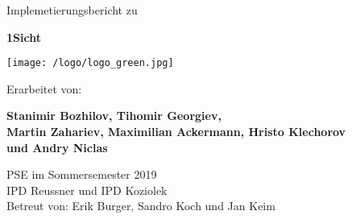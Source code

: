 \begin{titlepage}

    \begin{center}

        \vspace*{1cm}

            \LARGE
            Implemetierungsbericht zu

            \Huge
            \textbf{1Sicht}

            \vspace{2cm}

            \texttt{[image: /logo/logo\_green.jpg]}

            \vspace{2cm}
            Erarbeitet von:

            \Large
            \textbf{Stanimir Bozhilov, Tihomir Georgiev,\\ Martin Zahariev, Maximilian Ackermann, Hristo Klechorov\\ und Andry Niclas}

            \vspace{0.3cm}
            \Large
            PSE im Sommersemester 2019\\
            \vspace{0.3cm}
            IPD Reussner und IPD Koziolek\\
            Betreut von: Erik Burger, Sandro Koch und Jan Keim


    \end{center}

\end{titlepage}
